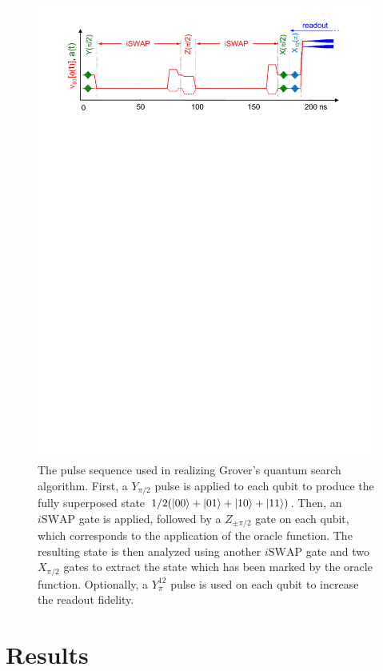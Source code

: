 \begin{figure}[h!]
	\centering
		\includegraphics[width=1.\textwidth]{./material/papers/grover/figures/grover_algorithm_pulse_sequence}
	\caption[Pulse sequence used for implementing Grovers search algorithm]{The pulse sequence used in realizing Grover's quantum search algorithm. First, a $Y_{\pi/2}$ pulse is applied to each qubit to produce the fully superposed state $1/2(\left| 00 \right>+\left| 01 \right>+\left| 10 \right>+\left| 11 \right>)$. Then, an $i\mathrm{SWAP}$ gate is applied, followed by a $Z_{\pm \pi /2}$ gate on each qubit, which corresponds to the application of the oracle function. The resulting state is then analyzed using another $i\mathrm{SWAP}$ gate and two $X_{\pi/2}$ gates to extract the state which has been marked by the oracle function. Optionally, a $Y^{12}_{\pi}$ pulse is used on each qubit to increase the readout fidelity.}
	\label{fig:GroverPulseSequence}
\end{figure}

\section{Results}

